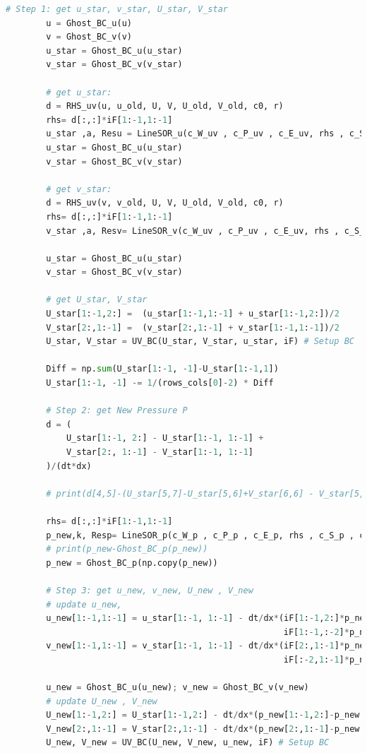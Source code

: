 \documentclass[12pt]{article}
\begin{document}
\begin{scriptsize}
\begin{lstlisting}[language=python,caption={N-S Cylinder Solver}]
        # Step 1: get u_star, v_star, U_star, V_star
        u = Ghost_BC_u(u)
        v = Ghost_BC_v(v)
        u_star = Ghost_BC_u(u_star)
        v_star = Ghost_BC_v(v_star)
        
        # get u_star:
        d = RHS_uv(u, u_old, U, V, U_old, V_old, c0, r)
        rhs= d[:,:]*iF[1:-1,1:-1]
        u_star ,a, Resu = LineSOR_u(c_W_uv , c_P_uv , c_E_uv, rhs , c_S_uv , c_N_uv, u)
        u_star = Ghost_BC_u(u_star)
        v_star = Ghost_BC_v(v_star)

        # get v_star:
        d = RHS_uv(v, v_old, U, V, U_old, V_old, c0, r) 
        rhs= d[:,:]*iF[1:-1,1:-1]
        v_star ,a, Resv= LineSOR_v(c_W_uv , c_P_uv , c_E_uv, rhs , c_S_uv , c_N_uv, v)

        u_star = Ghost_BC_u(u_star)
        v_star = Ghost_BC_v(v_star)

        # get U_star, V_star
        U_star[1:-1,2:] =  (u_star[1:-1,1:-1] + u_star[1:-1,2:])/2
        V_star[2:,1:-1] =  (v_star[2:,1:-1] + v_star[1:-1,1:-1])/2
        U_star, V_star = UV_BC(U_star, V_star, u_star, iF) # Setup BC

        Diff = np.sum(U_star[1:-1, -1]-U_star[1:-1,1])
        U_star[1:-1, -1] -= 1/(rows_cols[0]-2) * Diff

        # Step 2: get New Pressure P
        d = (
            U_star[1:-1, 2:] - U_star[1:-1, 1:-1] +
            V_star[2:, 1:-1] - V_star[1:-1, 1:-1]
        )/(dt*dx)

        # print(d[4,5]-(U_star[5,7]-U_star[5,6]+V_star[6,6] - V_star[5,6])/(dt*dx))

        rhs= d[:,:]*iF[1:-1,1:-1]
        p_new,k, Resp= LineSOR_p(c_W_p , c_P_p , c_E_p, rhs , c_S_p , c_N_p, p)
        # print(p_new-Ghost_BC_p(p_new))
        p_new = Ghost_BC_p(np.copy(p_new))

        # Step 3: get u_new, v_new, U_new , V_new
        # update u_new, 
        u_new[1:-1,1:-1] = u_star[1:-1, 1:-1] - dt/dx*(iF[1:-1,2:]*p_new[1:-1,2:] + iS[1:-1,2:]*p_new[1:-1,1:-1] -
                                                       iF[1:-1,:-2]*p_new[1:-1,:-2] - iS[1:-1,:-2]*p_new[1:-1,1:-1])/2 
        v_new[1:-1,1:-1] = v_star[1:-1, 1:-1] - dt/dx*(iF[2:,1:-1]*p_new[2:,1:-1] + iS[2:,1:-1]*p_new[1:-1,1:-1] -
                                                       iF[:-2,1:-1]*p_new[:-2,1:-1] - iS[:-2,1:-1]*p_new[1:-1,1:-1])/2

        u_new = Ghost_BC_u(u_new); v_new = Ghost_BC_v(v_new)
        # update U_new , V_new
        U_new[1:-1,2:] = U_star[1:-1,2:] - dt/dx*(p_new[1:-1,2:]-p_new[1:-1,1:-1])
        V_new[2:,1:-1] = V_star[2:,1:-1] - dt/dx*(p_new[2:,1:-1]-p_new[1:-1,1:-1])
        U_new, V_new = UV_BC(U_new, V_new, u_new, iF) # Setup BC


\end{lstlisting}
\end{scriptsize}
\end{document}
